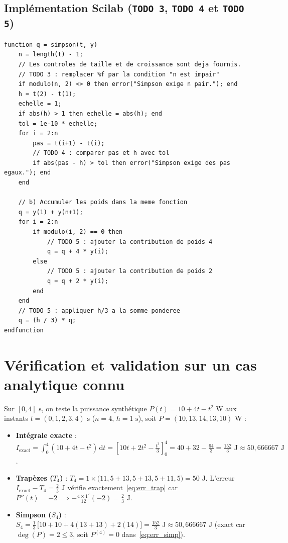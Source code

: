 \documentclass[10pt,a4paper]{article}
\begin{document}
\subsection{Implémentation Scilab (\texttt{TODO 3}, \texttt{TODO 4} et \texttt{TODO 5})}

\noindent\begin{minipage}{\textwidth}
\begin{lstlisting}[caption={Implémentation complète de la fonction \texttt{simpson(t, y)} sous Scilab.}]
function q = simpson(t, y)
    n = length(t) - 1;
    // Les controles de taille et de croissance sont deja fournis.
    // TODO 3 : remplacer %f par la condition "n est impair"
    if modulo(n, 2) <> 0 then error("Simpson exige n pair."); end
    h = t(2) - t(1);
    echelle = 1;
    if abs(h) > 1 then echelle = abs(h); end
    tol = 1e-10 * echelle;
    for i = 2:n
        pas = t(i+1) - t(i);
        // TODO 4 : comparer pas et h avec tol
        if abs(pas - h) > tol then error("Simpson exige des pas egaux."); end
    end

    // b) Accumuler les poids dans la meme fonction
    q = y(1) + y(n+1);
    for i = 2:n
        if modulo(i, 2) == 0 then
            // TODO 5 : ajouter la contribution de poids 4
            q = q + 4 * y(i);
        else
            // TODO 5 : ajouter la contribution de poids 2
            q = q + 2 * y(i);
        end
    end
    // TODO 5 : appliquer h/3 a la somme ponderee
    q = (h / 3) * q;
endfunction
\end{lstlisting}
\end{minipage}

\section{Vérification et validation sur un cas analytique connu}

Sur $[0, 4]\text{ s}$, on teste la puissance synthétique $P(t) = 10 + 4t - t^2\text{ W}$ aux instants $t = (0, 1, 2, 3, 4)\text{ s}$ ($n = 4$, $h = 1\text{ s}$), soit $P = (10, 13, 14, 13, 10)\text{ W}$ :
\begin{itemize}
    \item \textbf{Intégrale exacte} : $\displaystyle I_{\text{exact}} = \int_0^4 (10 + 4t - t^2)\,\mathrm{d}t = \left[10t + 2t^2 - \frac{t^3}{3}\right]_0^4 = 40 + 32 - \frac{64}{3} = \frac{152}{3}\text{ J} \approx 50,666667\text{ J}$.
    \item \textbf{Trapèzes ($T_4$)} : $\displaystyle T_4 = 1 \times \bigl(11,5 + 13,5 + 13,5 + 11,5\bigr) = 50\text{ J}$. L'erreur $I_{\text{exact}} - T_4 = \frac{2}{3}\text{ J}$ vérifie exactement~\eqref{eq:err_trap} car $P''(t) = -2 \implies -\frac{4 \times 1^2}{12}(-2) = \frac{2}{3}\text{ J}$.
    \item \textbf{Simpson ($S_4$)} : $\displaystyle S_4 = \frac{1}{3}\,\bigl[10 + 10 + 4(13 + 13) + 2(14)\bigr] = \frac{152}{3}\text{ J} \approx 50,666667\text{ J}$ (exact car $\deg(P) = 2 \le 3$, soit $P^{(4)} = 0$ dans~\eqref{eq:err_simp}).
\end{itemize}
\end{document}
